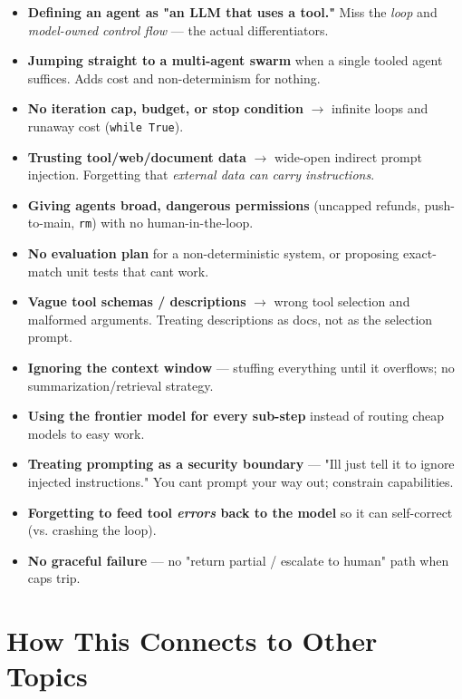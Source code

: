 \documentclass[11pt]{article}
\providecommand{\tightlist}{\setlength{\itemsep}{1pt}\setlength{\parskip}{0pt}}
\begin{document}
\begin{itemize}
\tightlist
\item
  \textbf{Defining an agent as "an LLM that uses a tool."} Miss the \emph{loop} and \emph{model-owned control flow} --- the actual differentiators.
\item
  \textbf{Jumping straight to a multi-agent swarm} when a single tooled agent suffices. Adds cost and non-determinism for nothing.
\item
  \textbf{No iteration cap, budget, or stop condition} \(\rightarrow\) infinite loops and runaway cost (\texttt{while\ True}).
\item
  \textbf{Trusting tool/web/document data} \(\rightarrow\) wide-open indirect prompt injection. Forgetting that \emph{external data can carry instructions}.
\item
  \textbf{Giving agents broad, dangerous permissions} (uncapped refunds, push-to-main, \texttt{rm}) with no human-in-the-loop.
\item
  \textbf{No evaluation plan} for a non-deterministic system, or proposing exact-match unit tests that can\textquotesingle t work.
\item
  \textbf{Vague tool schemas / descriptions} \(\rightarrow\) wrong tool selection and malformed arguments. Treating descriptions as docs, not as the selection prompt.
\item
  \textbf{Ignoring the context window} --- stuffing everything until it overflows; no summarization/retrieval strategy.
\item
  \textbf{Using the frontier model for every sub-step} instead of routing cheap models to easy work.
\item
  \textbf{Treating prompting as a security boundary} --- "I\textquotesingle ll just tell it to ignore injected instructions." You can\textquotesingle t prompt your way out; constrain capabilities.
\item
  \textbf{Forgetting to feed tool \emph{errors} back to the model} so it can self-correct (vs. crashing the loop).
\item
  \textbf{No graceful failure} --- no "return partial / escalate to human" path when caps trip.
\end{itemize}

\section{How This Connects to Other Topics}\label{how-this-connects-to-other-topics}
\end{document}

